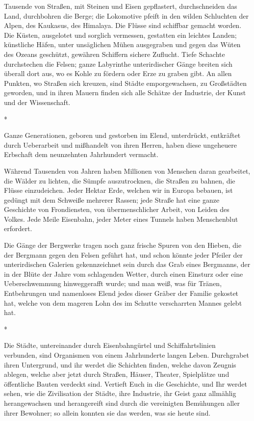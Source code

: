 \documentclass{scrbook}
\begin{document}
Tausende von Straßen, mit Steinen und Eisen gepflastert, durchschneiden das Land, durchbohren die Berge; die Lokomotive pfeift in den wilden Schluchten der Alpen, des Kaukasus, des Himalaya. Die Flüsse sind schiffbar gemacht worden. Die Küsten, ausgelotet und sorglich vermessen, gestatten ein leichtes Landen; künstliche Häfen, unter unsäglichen Mühen ausgegraben und gegen das Wüten des Ozeans geschützt, gewähren Schiffern sichere Zuflucht. Tiefe Schachte durchstechen die Felsen; ganze Labyrinthe unterirdischer Gänge breiten sich überall dort aus, wo es Kohle zu fördern oder Erze zu graben gibt. An allen Punkten, wo Straßen sich kreuzen, sind Städte emporgewachsen, zu Großstädten geworden, und in ihren Mauern finden sich alle Schätze der Industrie, der Kunst und der Wissenschaft.

\begin{center}*\end{center}

Ganze Generationen, geboren und gestorben im Elend, unterdrückt, entkräftet durch Ueberarbeit und mißhandelt von ihren Herren, haben diese ungeheuere Erbschaft dem neunzehnten Jahrhundert vermacht.

Während Tausenden von Jahren haben Millionen von Menschen daran gearbeitet, die Wälder zu lichten, die Sümpfe auszutrocknen, die Straßen zu bahnen, die Flüsse einzudeichen. Jeder Hektar Erde, welchen wir in Europa bebauen, ist gedüngt mit dem Schweiße mehrerer Rassen; jede Straße hat eine ganze Geschichte von Frondiensten, von übermenschlicher Arbeit, von Leiden des Volkes. Jede Meile Eisenbahn, jeder Meter eines Tunnels haben Menschenblut erfordert.

Die Gänge der Bergwerke tragen noch ganz frische Spuren von den Hieben, die der Bergmann gegen den Felsen geführt hat, und schon könnte jeder Pfeiler der unterirdischen Galerien gekennzeichnet sein durch das Grab eines Bergmanns, der in der Blüte der Jahre vom schlagenden Wetter, durch einen Einsturz oder eine Ueberschwemmung hinweggerafft wurde; und man weiß, was für Tränen, Entbehrungen und namenloses Elend jedes dieser Gräber der Familie gekostet hat, welche von dem mageren Lohn des im Schutte verscharrten Mannes gelebt hat.

\begin{center}*\end{center}

Die Städte, untereinander durch Eisenbahngürtel und Schiffahrtslinien verbunden, sind Organismen von einem Jahrhunderte langen Leben. Durchgrabet ihren Untergrund, und ihr werdet die Schichten finden, welche davon Zeugnis ablegen, welche aber jetzt durch Straßen, Häuser, Theater, Spielplätze und öffentliche Bauten verdeckt sind. Vertieft Euch in die Geschichte, und Ihr werdet sehen, wie die Zivilisation der Städte, ihre Industrie, ihr Geist ganz allmählig herangewachsen und herangereift sind durch die vereinigten Bemühungen aller ihrer Bewohner; so allein konnten sie das werden, was sie heute sind.
\end{document}
